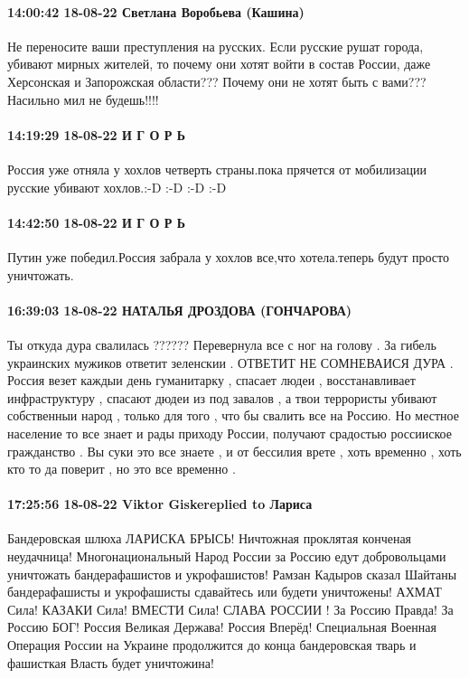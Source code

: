 \paragraph{14:00:42 18-08-22 Светлана Воробьева (Кашина)}

Не переносите ваши преступления на русских. Если русские рушат города, убивают
мирных жителей, то почему они хотят войти в состав России, даже Херсонская и
Запорожская области??? Почему они не хотят быть с вами??? Насильно мил не
будешь!!!!

\paragraph{14:19:29 18-08-22 И Г О Р Ь}

Россия уже отняла у хохлов четверть страны.пока прячется от мобилизации русские
убивают хохлов.:-D :-D :-D :-D

\paragraph{14:42:50 18-08-22 И Г О Р Ь}

Путин уже победил.Россия забрала у хохлов все,что хотела.теперь будут просто
уничтожать.

\paragraph{16:39:03 18-08-22 НАТАЛЬЯ ДРОЗДОВА (ГОНЧАРОВА)}

Ты откуда дура свалилась ??????
Перевернула все с ног на голову .
За гибель украинских мужиков ответит зеленскии .
ОТВЕТИТ НЕ СОМНЕВАИСЯ ДУРА .
Россия везет каждыи день гуманитарку , спасает людеи , восстанавливает инфраструктуру , спасают дюдеи из под завалов , а твои террористы убивают собственныи народ , только для того , что бы свалить все на Россию.
Но местное население то все знает и рады приходу России, получают срадостью россииское гражданство .
Вы суки это все знаете , и от бессилия врете , хоть временно , хоть кто то да поверит , но это все временно .

\paragraph{17:25:56 18-08-22 Viktor Giskereplied to Лариса}

Бандеровская шлюха ЛАРИСКА БРЫСЬ! Ничтожная проклятая конченая неудачница!
Многонациональный Народ России за Россию едут добровольцами уничтожать
бандерафашистов и укрофашистов! Рамзан Кадыров сказал Шайтаны бандерафашисты и
укрофашисты сдавайтесь или будети уничтожены! АХМАТ Сила! КАЗАКИ Сила! ВМЕСТИ
Сила! СЛАВА РОССИИ ! За Россию Правда! За Россию БОГ! Россия Великая Держава!
Россия Вперёд! Специальная Военная Операция России на Украине продолжится до
конца бандеровская тварь и фашисткая Власть будет уничтожина!

